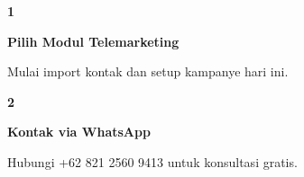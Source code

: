 \documentclass[a4paper]{article}
\begin{document}
\begin{center}
\begin{minipage}[t]{0.318\textwidth}
    \colorbox{BlueBg}{%
        \begin{minipage}{\dimexpr\linewidth-2\fboxsep\relax}
            \vspace{6pt}
            \begin{center}
                {\fontsize{22}{26}\selectfont\bfseries\color{BluePrimary} 1}
            \end{center}
            \vspace{2pt}
            \begin{center}
                {\fontsize{10}{13}\selectfont\bfseries\color{BlueDark} Pilih Modul Telemarketing}\par\vspace{3pt}
                {\fontsize{9}{12}\selectfont\color{TextDark} Mulai import kontak dan setup kampanye hari ini.}
            \end{center}
            \vspace{6pt}
        \end{minipage}}
\end{minipage}%
\hfill
\begin{minipage}[t]{0.318\textwidth}
    \colorbox{BlueBg}{%
        \begin{minipage}{\dimexpr\linewidth-2\fboxsep\relax}
            \vspace{6pt}
            \begin{center}
                {\fontsize{22}{26}\selectfont\bfseries\color{BluePrimary} 2}
            \end{center}
            \vspace{2pt}
            \begin{center}
                {\fontsize{10}{13}\selectfont\bfseries\color{BlueDark} Kontak via WhatsApp}\par\vspace{3pt}
                {\fontsize{9}{12}\selectfont\color{TextDark} Hubungi +62 821 2560 9413 untuk konsultasi gratis.}
            \end{center}
            \vspace{6pt}
        \end{minipage}}
\end{minipage}%
\hfill
\begin{minipage}[t]{0.318\textwidth}
    \colorbox{BlueBg}{%
        \begin{minipage}{\dimexpr\linewidth-2\fboxsep\relax}
            \vspace{6pt}

\end{minipage}}
\end{minipage}
\end{center}
\end{document}
